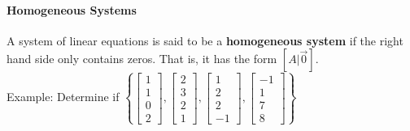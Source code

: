 \documentclass[10pt,letter]{article}
\begin{document}
\paragraph{Homogeneous Systems} A system of linear equations is said to be a \textbf{homogeneous system} if the right hand side only contains zeros. That is, it has the form $[A|\vec{0}]$. \\ 
Example: Determine if $\left\{\begin{bmatrix}1\\1\\0\\2\end{bmatrix} ,\begin{bmatrix}2\\3\\2\\1\end{bmatrix} ,\begin{bmatrix}1\\2\\2\\-1\end{bmatrix} ,\begin{bmatrix}-1\\1\\7\\8\end{bmatrix} \right\}$ \\ 
\end{document}
